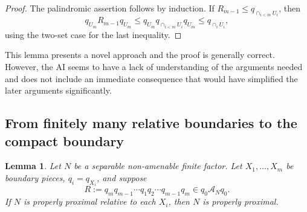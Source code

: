 \documentclass[12pt]{article}
\newtheorem{lemma}{Lemma}
\newcommand{\cA}{\mathcal A}
\newcommand{\review}[1]{\begin{reviewbox}#1\end{reviewbox}}
\begin{document}
\begin{proof}
The palindromic assertion follows by induction.  If
\(R_{m-1}\le q_{\cap_{i<m}U_i}\), then
\[
q_{U_m}R_{m-1}q_{U_m}
 \le q_{U_m}q_{\cap_{i<m}U_i}q_{U_m}
 \le q_{\cap_iU_i},
\]
using the two-set case for the last inequality.
\end{proof}

\review{This lemma presents a novel approach and the proof is generally correct. However, the AI seems to have a lack of understanding of the arguments needed and does not include an immediate consequence that would have simplified the later arguments significantly.}

\subsection*{From finitely many relative boundaries to the compact boundary}

\begin{lemma}\label{lem:finite}
Let \(N\) be a separable non-amenable finite factor.  Let
\(X_1,\ldots,X_m\) be boundary pieces, \(q_i=q_{X_i}\), and suppose
\[
        R:=q_mq_{m-1}\cdots q_1q_2\cdots q_{m-1}q_m\in q_0\cA_Nq_0. \tag{6}
\]
If \(N\) is properly proximal relative to each \(X_i\), then \(N\) is properly
proximal.
\end{lemma}
\end{document}
